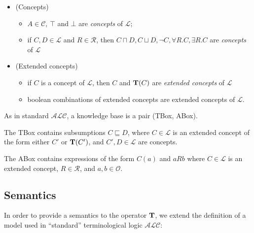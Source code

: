 \documentclass[a4paper, 11pt, oneside]{duthesis}
\newcommand{\tip}{{\bf T}}
\newcommand{\alc}{\mathcal{ALC}}
\newcommand{\vero} {\top}
\newcommand{\elle} {\mathcal{L}}
\begin{document}
\begin{itemize}
\item (Concepts)
  \begin{itemize}
     \item $A \in \mathcal{C}$, $\vero$ and $\bot$ are \emph{concepts} of
$\elle$;
    \item if $C, D \in \elle$ and $R \in \mathcal{R}$, then $C
\sqcap D, C \sqcup D, \neg C, \forall R.C, \exists R.C$ are
\emph{concepts} of $\elle$
  \end{itemize}
\item (Extended concepts)
    \begin{itemize}
       \item if $C$ is a
concept of $\elle$, then $C$ and $\tip(C)$ are \emph{extended concepts} of $\elle$
     \item boolean combinations of extended concepts are extended
concepts of $\elle$.
    \end{itemize}
\end{itemize}

\noindent  As in standard $\mathcal{ALC}$, a knowledge base is a pair (TBox, ABox).

The TBox contains subsumptions $C \sqsubseteq D$, where $C \in \elle$ is an extended concept of the form either $C'$ or $\tip(C')$, and $C', D \in \elle$ are concepts.

The ABox contains expressions of the form $C(a)$ and $aRb$ where $C \in \elle$ is an extended concept, $R \in \mathcal{R}$, and $a, b \in \mathcal{O}$.

\newpage

\subsection{Semantics}

In order to provide a semantics to the operator $\tip$, we extend the definition of a model used in ``standard'' terminological logic $\alc$:
\end{document}
